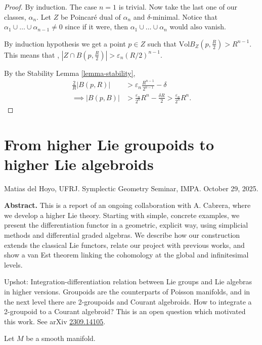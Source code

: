 \begin{proof}
By induction. The case $n=1$ is trivial.
Now take the last one of our classes,
$\alpha_n$.
Let $Z$ be Poincaré dual of $\alpha_n$ and
$\delta$-minimal.
Notice that $\alpha_1\cup \ldots \cup
\alpha_{n-1}\neq 0$
since if it were, then $\alpha_1\cup
\ldots\cup \alpha_n$ would also vanish.

By induction hypothesis we get a point $p \in
Z$
such that $\text{Vol} B_Z(p,\frac{R}{2}) >
R^{n-1}$.
This means that , $|Z \cap
B(p,\frac{R}{2})|>\varepsilon_n(R/2)^{n-1}$.

By the Stability Lemma \ref{lemma-stability},
$$
\begin{aligned}
\frac{2}{R}|B(p,R)|&>\varepsilon_n\frac{R^{n-
1}}{2^{n-1}}-\delta\\
\implies
|B(p,B)|&>\frac{\varepsilon_n}{2^n}R^n-
\frac{\delta
R}{2}
> \frac{\varepsilon_n}{2^n}R^n.
\end{aligned}
$$
\end{proof}

\section{From higher Lie groupoids to higher
Lie algebroids}
\label{section-highe-group-highe-algeb}

\noindent
Matias del Hoyo, UFRJ.
Symplectic Geometry Seminar, IMPA.
October 29, 2025.

\medskip\noindent
{\bf Abstract.}
This is a report of an ongoing collaboration
with A. Cabrera, where we develop a
higher Lie theory. Starting with simple,
concrete examples, we present the
differentiation functor in a geometric,
explicit way, using simplicial methods
and differential graded algebras. We describe
how our construction extends the
classical Lie functors, relate our project
with previous works, and show a van
Est theorem linking the cohomology at the
global and infinitesimal levels.

\medskip\noindent

Upshot: Integration-differentiation relation
between Lie groups and Lie algebras
in higher versions. Groupoids are the
counterparts of Poisson manifolds, and in
the next level there are 2-groupoids and
Courant algebroids. How to integrate a
2-groupoid to a Courant algebroid? This is an
open question which motivated this
work. See arXiv
\href{http://arxiv.org/abs/2309.14105}%
{2309.14105}.

\medskip\noindent
Let $M$ be a smooth manifold.

